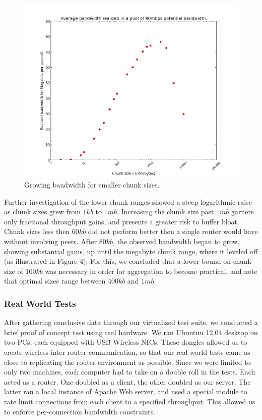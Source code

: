 \documentclass[12pt]{article}
\begin{document}
		\begin{figure}[H]
			\centering
			\includegraphics[keepaspectratio=true,scale=0.6]{small_sizes_lineplot.png}
			\caption{Growing bandwidth for smaller chunk sizes.}
		\end{figure}

		Further investigation of the lower chunk ranges showed a steep logarithmic raise as chunk sizes grew from $1 kb$ to $1 mb$. Increasing the chunk size past $1 mb$ garners only fractional throughput gains, and presents a greater risk to buffer bloat. Chunk sizes less then $60 kb$ did not perform better then a single router would have without involving peers. After $80 kb$, the observed bandwidth began to grow, showing substantial gains, up until the megabyte chunk range, where it leveled off (as illustrated in Figure 4). For this, we concluded that a lower bound on chunk size of $100 kb$ was necessary in order for aggregation to become practical, and note that optimal sizes range between $400 kb$ and $1 mb$.

	\subsubsection{Real World Tests}

		After gathering conclusive data through our virtualized test suite, we conducted a brief proof of concept test using real hardware. We ran Ubuntuu 12.04 desktop on two PCs, each equipped with USB Wireless NICs. These dongles allowed us to create wireless inter-router communication, so that our real world tests came as close to replicating the router environment as possible. Since we were limited to only two machines, each computer had to take on a double roll in the tests. Each acted as a router. One doubled as a client, the other doubled as our server. The latter ran a local instance of Apache Web server, and used a special module to rate limit connections from each client to a specified throughput. This allowed us to enforce per-connection bandwidth constraints. 
\end{document}
